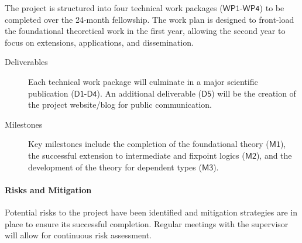 \documentclass[11pt]{msca-pf}
\newcommand{\WP}[1]{$\mathsf{WP#1}$}
\newcommand{\MI}[1]{$\mathsf{M#1}$}
\newcommand{\DE}[1]{$\mathsf{D#1}$}
\begin{document}
The project is structured into four technical work packages (\WP{1}-\WP{4}) to be completed over the
24-month fellowship. The work plan is designed to front-load the foundational theoretical work in
the first year, allowing the second year to focus on extensions, applications, and dissemination.

\begin{description}
    \item[Deliverables] Each technical work package will culminate in a major scientific publication
    (\DE{1}-\DE{4}). An additional deliverable (\DE{5}) will be the creation of the project
    website/blog for public communication.
    \item[Milestones] Key milestones include the completion of the foundational theory (\MI{1}), the
    successful extension to intermediate and fixpoint logics (\MI{2}), and the development of the
    theory for dependent types (\MI{3}).
\end{description}

\paragraph{Risks and Mitigation}
Potential risks to the project have been identified and mitigation strategies are in place to ensure
its successful completion. Regular meetings with the supervisor will allow for continuous risk
assessment.
\end{document}
